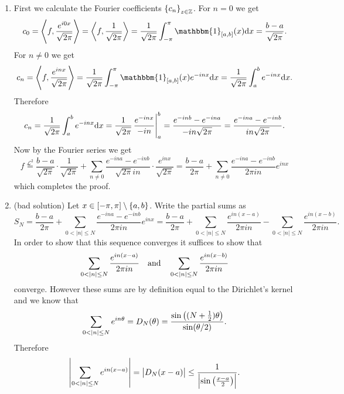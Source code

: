\documentclass[11pt,a4paper]{article}
\begin{document}
\begin{solution} \phantom{}
  \begin{enumerate}
    \item[(1)] First we calculate the
      Fourier coefficients $\left\{c_n\right\}_{z \in \mathbb{Z}}$.
      For $n = 0$ we get
      \[
        c_0 =
        \ip{f}{\frac{e^{i 0 x}}{\sqrt{2\pi}}} =
        \ip{f}{\frac{1}{\sqrt{2\pi}}} =
        \frac{1}{\sqrt{2\pi}} \int_{-\pi}^{\pi} \mathbbm{1}_{[a,b]}(x) \dx =
        \frac{b - a}{\sqrt{2\pi}}.
      \]
      For $n \neq 0$ we get
      \[
        c_n =
        \ip{f}{\frac{e^{i n x}}{\sqrt{2\pi}}} =
        \frac{1}{\sqrt{2\pi}}
          \int_{-\pi}^{\pi} \mathbbm{1}_{[a,b]}(x) e^{- i n x} \dx =
        \frac{1}{\sqrt{2\pi}} \int_{a}^{b} e^{- i n x} \dx.
      \]
      Therefore
      \[
        c_n =
        \frac{1}{\sqrt{2\pi}} \int_{a}^{b} e^{- i n x} \dx =
        \frac{1}{\sqrt{2\pi}} \eval{\frac{e^{-i n x}}{-i n}}_{a}^{b} =
        \frac{e^{-i n b} - e^{-i n a}}{-i n \sqrt{2\pi}} =
        \frac{e^{-i n a} - e^{-i n b}}{i n \sqrt{2\pi}}.
      \]
      Now by the Fourier series we get
      \[
        f \overset{\mathcal L^2}{=}
        \frac{b - a}{\sqrt{2\pi}} \cdot \frac{1}{\sqrt{2\pi}} +
        \sum_{n \neq 0} \frac{e^{-i n a} - e^{-i n b}}{\sqrt{2\pi} i n} \cdot
        \frac{e^{i n x}}{\sqrt{2\pi}} =
        \frac{b - a}{2\pi} +
        \sum_{n \neq 0} \frac{e^{-i n a} - e^{-i n b}}{2\pi i n}
        e^{i n x}
      \]
      which completes the proof.
    \item[(2)] (bad solution) Let $x \in [-\pi,\pi] \setminus \left\{a,b\right\}$. %
      Write the partial sums as
      \[
        S_N =
        \frac{b - a}{2 \pi} +
        \sum_{0 < |n| \le N} \frac{e^{-i n a} - e^{-i n b}}{2\pi i n} e^{i n x}=
        \frac{b - a}{2 \pi} +
        \sum_{0 < |n| \le N} \frac{e^{i n (x - a)}}{2\pi i n} -
        \sum_{0 < |n| \le N} \frac{e^{i n (x - b)}}{2\pi i n}.
      \]
      In order to show that this sequence converges it suffices to show that
      \[
        \sum_{0 < |n| \le N} \frac{e^{i n (x - a)}}{2\pi i n} \quad \text{and} \quad
        \sum_{0 < |n| \le N} \frac{e^{i n (x - b)}}{2\pi i n}
      \]
      converge.
      However these sums are by definition equal to the Dirichlet's kernel
      and we know that
      \[
        \sum_{0 < |n| \le N} e^{i n \theta} =
        D_N(\theta) =
        \frac{\sin\del{(N + \half) \theta}}{\sin(\theta/2)}.
      \]
      Therefore
      \[
        \abs{\sum_{0 < |n| \le N} e^{i n (x - a)}} =
        \abs{D_N(x-a)} \le
        \frac{1}{\abs{\sin\del{\frac{x - a}{2}}}}.
\]
\end{enumerate}
\end{solution}
\end{document}
